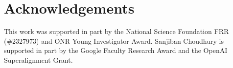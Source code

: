 \section*{Acknowledgements}
This work was supported in part by the National Science Foundation FRR (\#2327973) and ONR Young Investigator Award. Sanjiban Choudhury is supported in part by the Google Faculty Research Award and the OpenAI Superalignment Grant.